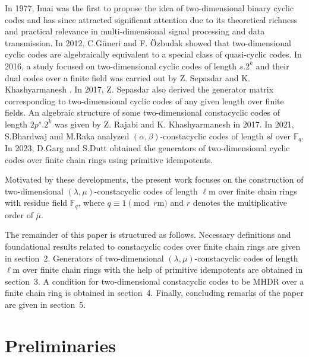 \documentclass[12pt,a4paper]{article}
\begin{document}
\medskip
In 1977, Imai \cite{imai1977theory} was the first to propose the idea of two-dimensional binary cyclic codes and has since attracted significant attention due to its theoretical richness and practical relevance in multi-dimensional signal processing and data transmission. In 2012, C.Güneri and F. Özbudak \cite{guneri2012relation} showed that two-dimensional cyclic codes are algebraically equivalent to a special class of quasi-cyclic codes. In 2016, a study focused on two-dimensional cyclic codes of length $s.2^k$ and their dual codes over a finite field was carried out by Z. Sepasdar and K. Khashyarmanesh \cite{sepasdar2016characterizations}. In 2017, Z. Sepasdar \cite{sepasdar2017generator} also derived the generator matrix corresponding to two-dimensional cyclic codes of any given length over finite fields. An algebraic structure of some two-dimensional constacyclic codes of length $2p^s.2^k$ was given by Z. Rajabi and K. Khashyarmanesh \cite{rajabi2018repeated} in 2017. In 2021, S.Bhardwaj and M.Raka \cite{bhardwaj2022} analyzed $(\alpha,\beta)$-constacyclic codes of length $sl$ over $\mathbb{F}_q$. In 2023, D.Garg and S.Dutt \cite{garg2024two} obtained the generators of two-dimensional cyclic codes over finite chain rings using primitive idempotents.

\medskip
Motivated by these developments, the present work focuses on the construction of two-dimensional $(\lambda, \mu)$-constacyclic codes of length $\ell\mathrm{m}$ over finite chain rings with residue field $\mathbb{F}_q$, where $q \equiv 1 \pmod{r\mathrm{m}}$ and $r$ denotes the multiplicative order of $\bar{\mu}$.

The remainder of this paper is structured as follows. Necessary definitions and foundational results related to constacyclic codes over finite chain rings are given in section~2. Generators of two-dimensional $(\lambda,\mu)$-constacyclic codes of length $\ell\mathrm{m}$ over finite chain rings with the help of primitive idempotents are obtained in section~3.  A condition for two-dimensional constacyclic codes to be MHDR over a finite chain ring is obtained in section~4. Finally, concluding remarks of the paper are given in section~5.


\section{Preliminaries}
\end{document}
